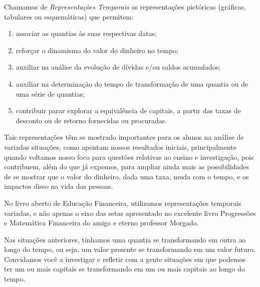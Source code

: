 \begin{paginatexto2}
  Chamamos de \textit{Representações Temporais} as representações pictóricas (gráficas, tabulares ou esquemáticas) que permitem:
  \clearpage
  \begin{enumerate}
    \item associar as quantias às suas respectivas datas;
    \item reforçar o dinamismo do valor do dinheiro no tempo;
    \item auxiliar na análise da evolução de dívidas e/ou saldos acumulados;
    \item auxiliar na determinação do tempo de transformação de uma quantia ou de uma série de quantias;
    \item contribuir parar explorar a equivalência de capitais, a partir das taxas de desconto ou de retorno fornecidas ou procuradas.
  \end{enumerate}

Tais representações têm se mostrado importantes para os alunos na análise de variadas situações, como apontam nossos resultados iniciais, principalmente quando voltamos nosso foco para questões relativas ao ensino e investigação, pois contribuem, além do que já expomos, para ampliar ainda mais as possibilidades de se mostrar que o valor do dinheiro, dada uma taxa, muda com o tempo, e os impactos disso na vida das pessoas.

No livro aberto de Educação Financeira, utilizamos representações temporais variadas, e não apenas o eixo das setas apresentado no excelente livro Progressões e Matemática Financeira do amigo e eterno professor Morgado.
\end{paginatexto2}
\clearpage

Nas situações anteriores, tínhamos uma quantia se transformando em outra ao longo do tempo, ou seja, um valor presente se transformando em um valor futuro. Convidamos você a investigar e refletir com a gente situações em que podemos ter um ou mais capitais se transformando em um ou mais capitais ao longo do tempo.



